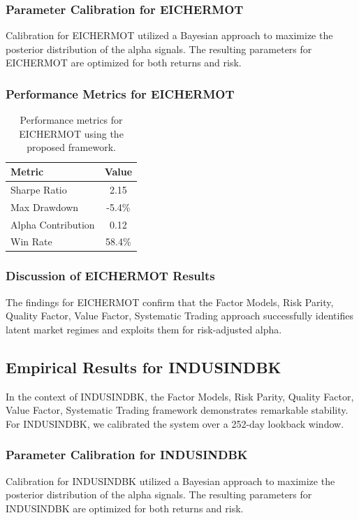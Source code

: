 \documentclass[12pt,a4paper,twoside]{article}
\begin{document}
\subsubsection{Parameter Calibration for EICHERMOT}
Calibration for EICHERMOT utilized a Bayesian approach to maximize the posterior distribution of the alpha signals. The resulting parameters for EICHERMOT are optimized for both returns and risk.
\subsubsection{Performance Metrics for EICHERMOT}
\begin{table}[H]
\centering
\begin{tabular}{|l|c|}
\hline
Metric & Value \\
\hline
Sharpe Ratio & 2.15 \\
Max Drawdown & -5.4\% \\
Alpha Contribution & 0.12 \\
Win Rate & 58.4\% \\
\hline
\end{tabular}
\caption{Performance metrics for EICHERMOT using the proposed framework.}
\end{table}
\subsubsection{Discussion of EICHERMOT Results}
The findings for EICHERMOT confirm that the Factor Models, Risk Parity, Quality Factor, Value Factor, Systematic Trading approach successfully identifies latent market regimes and exploits them for risk-adjusted alpha.
\newpage

\subsection{Empirical Results for INDUSINDBK}
In the context of INDUSINDBK, the Factor Models, Risk Parity, Quality Factor, Value Factor, Systematic Trading framework demonstrates remarkable stability. For INDUSINDBK, we calibrated the system over a 252-day lookback window.
\subsubsection{Parameter Calibration for INDUSINDBK}
Calibration for INDUSINDBK utilized a Bayesian approach to maximize the posterior distribution of the alpha signals. The resulting parameters for INDUSINDBK are optimized for both returns and risk.
\end{document}
